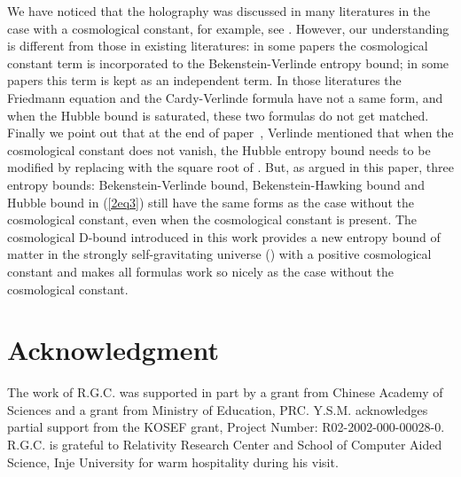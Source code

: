 \documentclass[a4paper,12pt]{article}
\begin{document}
We have noticed that the holography was discussed in many  literatures in the
case with a cosmological constant, for example, 
see \cite{Ogush,deSitter,Padi,Wang,Nojiri,Youm,Medved}. However, our understanding
is different from those in existing literatures: in some papers the cosmological
constant term is incorporated to the Bekenstein-Verlinde entropy bound; in some
papers this term is kept as an independent term. In those literatures the Friedmann
equation and the Cardy-Verlinde formula have not a same form, and when the Hubble 
bound is saturated, these two formulas do not get matched.  Finally we point out
that at the end of paper~\cite{Verl}, Verlinde mentioned that when the cosmological constant
does not vanish, the Hubble entropy bound needs to be modified by replacing \coordHE{} with
the square root of \coordHE{}. But, as argued in this paper, three entropy 
bounds: Bekenstein-Verlinde bound, Bekenstein-Hawking bound and Hubble bound 
in (\ref{2eq3}) still have the same forms as the case without the cosmological constant,
even when the cosmological constant is present. The cosmological D-bound introduced
in this work provides a new entropy bound of matter in the strongly self-gravitating 
universe (\coordHE{}) with a positive cosmological constant and makes all formulas work so 
nicely as the case without the cosmological constant.



\section*{Acknowledgment}

The work  of R.G.C. was supported in part by a grant from Chinese
Academy of Sciences and a grant from Ministry of Education, PRC.  
Y.S.M. acknowledges partial support from the KOSEF grant, Project 
Number: R02-2002-000-00028-0. R.G.C. is grateful to Relativity Research Center 
and School of Computer Aided Science, Inje University for warm hospitality 
during his visit.
\end{document}
